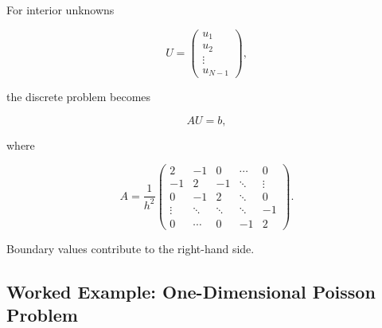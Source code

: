 For interior unknowns

\[
U
=
\begin{pmatrix}
u_1\\
u_2\\
\vdots\\
u_{N-1}
\end{pmatrix},
\]

the discrete problem becomes

\[
\boxed{
AU=b,
}
\]

where

\[
\boxed{
A
=
\frac1{h^2}
\begin{pmatrix}
2&-1&0&\cdots&0\\
-1&2&-1&\ddots&\vdots\\
0&-1&2&\ddots&0\\
\vdots&\ddots&\ddots&\ddots&-1\\
0&\cdots&0&-1&2
\end{pmatrix}.
}
\]

Boundary values contribute to the right-hand side.

\subsection{Worked Example: One-Dimensional Poisson Problem}
\label{subsec:worked-poisson-1d}

